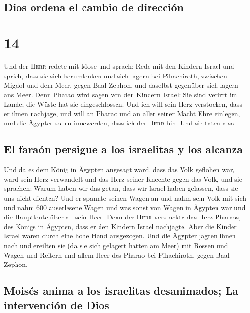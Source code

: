 \hypertarget{dios-ordena-el-cambio-de-direcciuxf3n}{%
\subsection{Dios ordena el cambio de
dirección}\label{dios-ordena-el-cambio-de-direcciuxf3n}}

\hypertarget{section-13}{%
\section{14}\label{section-13}}

 Und der \textsc{Herr} redete mit Mose und sprach:
 Rede mit den Kindern Israel und sprich, dass sie sich
herumlenken und sich lagern bei Pihachiroth, zwischen Migdol und dem
Meer, gegen Baal-Zephon, und daselbst gegenüber sich lagern ans Meer.
 Denn Pharao wird sagen von den Kindern Israel: Sie sind
verirrt im Lande; die Wüste hat sie eingeschlossen.  Und
ich will sein Herz verstocken, dass er ihnen nachjage, und will an
Pharao und an aller seiner Macht Ehre einlegen, und die Ägypter sollen
innewerden, dass ich der \textsc{Herr} bin. Und sie taten also.

\hypertarget{el-farauxf3n-persigue-a-los-israelitas-y-los-alcanza}{%
\subsection{El faraón persigue a los israelitas y los
alcanza}\label{el-farauxf3n-persigue-a-los-israelitas-y-los-alcanza}}

 Und da es dem König in Ägypten angesagt ward, dass das
Volk geflohen war, ward sein Herz verwandelt und das Herz seiner Knechte
gegen das Volk, und sie sprachen: Warum haben wir das getan, dass wir
Israel haben gelassen, dass sie uns nicht dienten?  Und er
spannte seinen Wagen an und nahm sein Volk mit sich  und
nahm 600 auserlesene Wagen und was sonst von Wagen in Ägypten war und
die Hauptleute über all sein Heer.  Denn der \textsc{Herr}
verstockte das Herz Pharaos, des Königs in Ägypten, dass er den Kindern
Israel nachjagte. Aber die Kinder Israel waren durch eine hohe Hand
ausgezogen.  Und die Ägypter jagten ihnen nach und
ereilten sie (da sie sich gelagert hatten am Meer) mit Rossen und Wagen
und Reitern und allem Heer des Pharao bei Pihachiroth, gegen
Baal-Zephon.

\hypertarget{moisuxe9s-anima-a-los-israelitas-desanimados-la-intervenciuxf3n-de-dios}{%
\subsection{Moisés anima a los israelitas desanimados; La intervención
de
Dios}\label{moisuxe9s-anima-a-los-israelitas-desanimados-la-intervenciuxf3n-de-dios}}

